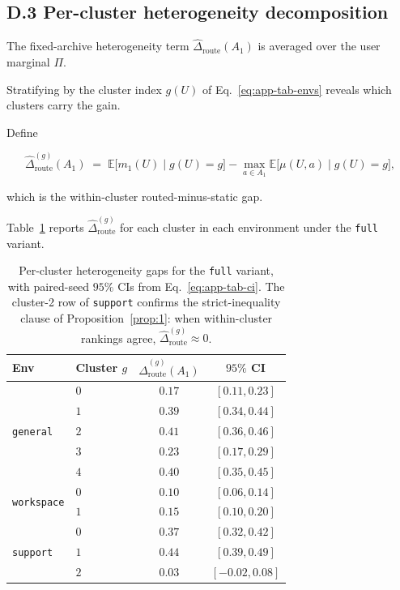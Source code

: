 \documentclass{article} %
\begin{document}
\subsection{D.3 Per-cluster heterogeneity decomposition}

\label{app:tab-cluster}

The fixed-archive heterogeneity term $\widehat\Delta_{\mathrm{route}}(A_1)$ is averaged over the user marginal $\Pi$.

Stratifying by the cluster index $g(U)$ of Eq.~\eqref{eq:app-tab-envs} reveals which clusters carry the gain.

Define

\begin{equation}
\label{eq:app-tab-clustergap}
\widehat\Delta_{\mathrm{route}}^{(g)}(A_1) \;=\; \mathbb{E}\big[m_1(U)\mid g(U)=g\big] - \max_{a \in A_1} \mathbb{E}\big[\mu(U,a)\mid g(U)=g\big],
\end{equation}

which is the within-cluster routed-minus-static gap.

Table~\ref{tab:app-cluster} reports $\widehat\Delta_{\mathrm{route}}^{(g)}$ for each cluster in each environment under the \texttt{full} variant.

\begin{table}[h]
\centering
\small
\begin{tabular}{llcc}
\toprule
Env & Cluster $g$ & $\widehat\Delta_{\mathrm{route}}^{(g)}(A_1)$ & $95\%$ CI \\
\midrule
\multirow{5}{*}{\texttt{general}}
 & $0$ & $0.17$ & $[0.11, 0.23]$ \\
 & $1$ & $0.39$ & $[0.34, 0.44]$ \\
 & $2$ & $0.41$ & $[0.36, 0.46]$ \\
 & $3$ & $0.23$ & $[0.17, 0.29]$ \\
 & $4$ & $0.40$ & $[0.35, 0.45]$ \\
\midrule
\multirow{2}{*}{\texttt{workspace}}
 & $0$ & $0.10$ & $[0.06, 0.14]$ \\
 & $1$ & $0.15$ & $[0.10, 0.20]$ \\
\midrule
\multirow{3}{*}{\texttt{support}}
 & $0$ & $0.37$ & $[0.32, 0.42]$ \\
 & $1$ & $0.44$ & $[0.39, 0.49]$ \\
 & $2$ & $0.03$ & $[-0.02, 0.08]$ \\
\bottomrule
\end{tabular}
\caption{Per-cluster heterogeneity gaps for the \texttt{full} variant, with paired-seed $95\%$ CIs from Eq.~\eqref{eq:app-tab-ci}. The cluster-2 row of \texttt{support} confirms the strict-inequality clause of Proposition~\ref{prop:1}: when within-cluster rankings agree, $\widehat\Delta_{\mathrm{route}}^{(g)} \approx 0$.}
\label{tab:app-cluster}
\end{table}
\end{document}

